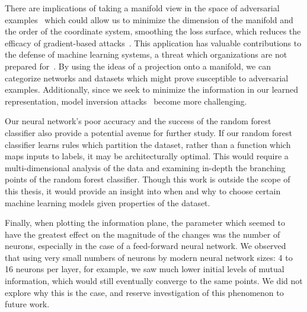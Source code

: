 
There are implications of taking a manifold view in the space of adversarial examples~\cite{szegedy2013intriguing} which could allow us to minimize the dimension of the manifold and the order of the coordinate system, smoothing the loss surface, which reduces the efficacy of gradient-based attacks~\cite{athalye2018obfuscated}.
This application has valuable contributions to the defense of machine learning systems, a threat which organizations are not prepared for~\cite{kumar2020adversarial}.
By using the ideas of a projection onto a manifold, we can categorize networks and datasets which might prove susceptible to adversarial examples.
Additionally, since we seek to minimize the information in our learned representation, model inversion attacks~\cite{zhang2019secret} become more challenging.

Our neural network's poor accuracy and the success of the random forest classifier also provide a potential avenue for further study.
If our random forest classifier learns rules which partition the dataset, rather than a function which maps inputs to labels, it may be architecturally optimal. 
This would require a multi-dimensional analysis of the data and examining in-depth the branching points of the random forest classifier.
Though this work is outside the scope of this thesis, it would provide an insight into when and why to choose certain machine learning models given properties of the dataset.

Finally, when plotting the information plane, the parameter which seemed to have the greatest effect on the magnitude of the changes was the number of neurons, especially in the case of a feed-forward neural network.
We observed that using very small numbers of neurons by modern neural network sizes: 4 to 16 neurons per layer, for example, we saw much lower initial levels of mutual information, which would still eventually converge to the same points. 
We did not explore why this is the case, and reserve investigation of this phenomenon to future work.